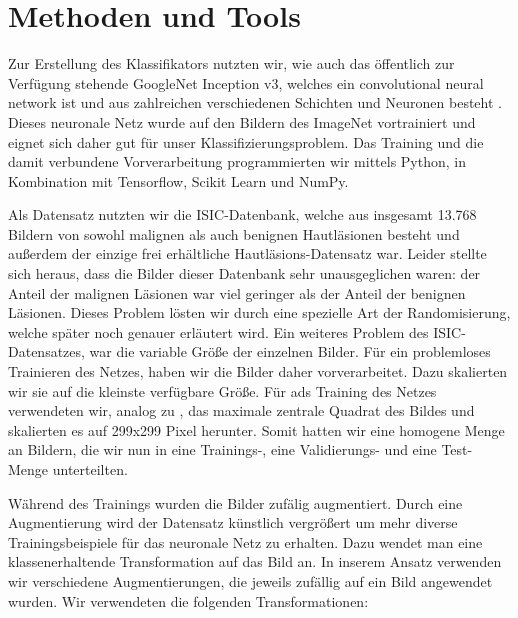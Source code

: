 \section{Methoden und Tools}

Zur Erstellung des Klassifikators nutzten wir, wie \citet{esteva2017dermatologist} auch das öffentlich zur Verfügung stehende GoogleNet Inception v3, welches ein convolutional neural network ist und aus zahlreichen verschiedenen Schichten und Neuronen besteht \citep{szegedy2016rethinking} . Dieses neuronale Netz wurde auf den Bildern des ImageNet vortrainiert \citep{russakovsky2015imagenet} und eignet sich daher gut für unser Klassifizierungsproblem.  Das Training und die damit verbundene Vorverarbeitung programmierten wir mittels Python, in Kombination mit Tensorflow, Scikit Learn und NumPy. 

Als Datensatz nutzten wir die ISIC-Datenbank, welche aus insgesamt 13.768 Bildern von sowohl malignen als auch benignen Hautläsionen besteht und außerdem der einzige frei erhältliche Hautläsions-Datensatz war. Leider stellte sich heraus, dass die Bilder dieser Datenbank sehr unausgeglichen waren: der Anteil der malignen Läsionen war viel geringer als der Anteil der benignen Läsionen. Dieses Problem lösten wir durch eine spezielle Art der Randomisierung, welche später noch genauer erläutert wird. Ein weiteres Problem des ISIC-Datensatzes, war die variable Größe der einzelnen Bilder. Für ein problemloses Trainieren des Netzes, haben wir die Bilder daher vorverarbeitet. Dazu skalierten wir sie auf die kleinste verfügbare Größe. Für ads Training des Netzes verwendeten wir, analog zu \citep{esteva2017dermatologist}, das maximale zentrale Quadrat des Bildes und skalierten es auf 299x299 Pixel herunter. Somit hatten wir eine homogene Menge an Bildern, die wir nun in eine Trainings-, eine Validierungs- und eine Test-Menge unterteilten.

Während des Trainings wurden die Bilder zufälig augmentiert. Durch eine Augmentierung wird der Datensatz künstlich vergrößert um mehr diverse Trainingsbeispiele für das neuronale Netz zu erhalten. Dazu wendet man eine klassenerhaltende Transformation auf das Bild an. In inserem Ansatz verwenden wir verschiedene Augmentierungen, die jeweils zufällig auf ein Bild angewendet wurden. Wir verwendeten die folgenden Transformationen:

